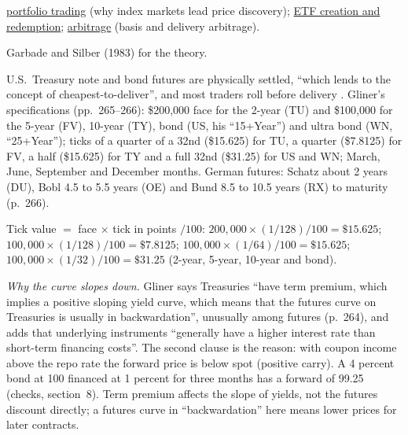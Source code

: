 \begin{qfevidence}
 \hyperref[def:portfolio-trading]{portfolio trading} (why index markets lead price discovery); \hyperref[mech:etf-creation-redemption]{ETF creation and redemption}; \hyperref[def:arbitrage]{arbitrage} (basis and delivery arbitrage).

 Garbade and Silber (1983) for the theory.

\end{qfevidence}

\begin{qfconvention}\label{conv:government-bond-futures}
 U.S.\ Treasury note and bond futures are physically settled, ``which lends to the concept of cheapest-to-deliver'', and most traders roll before delivery \citep[chap.~9, sec.\ ``U.S.\ Fixed Income Futures'', PDF p.~264]{s7-gliner}. Gliner's specifications (pp.~265--266): \$200,000 face for the 2-year (TU) and \$100,000 for the 5-year (FV), 10-year (TY), bond (US, his ``15+Year'') and ultra bond (WN, ``25+Year''); ticks of a quarter of a 32nd (\$15.625) for TU, a quarter (\$7.8125) for FV, a half (\$15.625) for TY and a full 32nd (\$31.25) for US and WN; March, June, September and December months. German futures: Schatz about 2 years (DU), Bobl 4.5 to 5.5 years (OE) and Bund 8.5 to 10.5 years (RX) to maturity (p.~266).

 Tick value $=$ face $\times$ tick in points $/100$: $200{,}000\times(1/128)/100=\$15.625$; $100{,}000\times(1/128)/100=\$7.8125$; $100{,}000\times(1/64)/100=\$15.625$; $100{,}000\times(1/32)/100=\$31.25$ (2-year, 5-year, 10-year and bond).

 \emph{Why the curve slopes down.} Gliner says Treasuries ``have term premium, which implies a positive sloping yield curve, which means that the futures curve on Treasuries is usually in backwardation'', unusually among futures (p.~264), and adds that underlying instruments ``generally have a higher interest rate than short-term financing costs''. The second clause is the reason: with coupon income above the repo rate the forward price is below spot (positive carry). A 4 percent bond at 100 financed at 1 percent for three months has a forward of 99.25 (checks, section~8). Term premium affects the slope of yields, not the futures discount directly; a futures curve in ``backwardation'' here means lower prices for later contracts.


\end{qfconvention}
